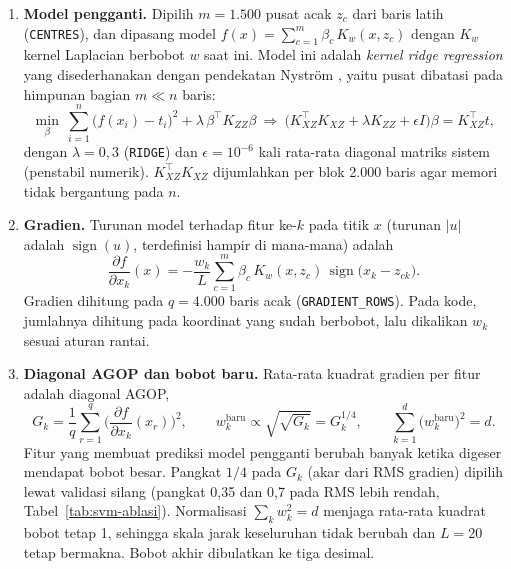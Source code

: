 \begin{enumerate}
	\item \textbf{Model pengganti.} Dipilih $m = 1.500$ pusat acak $z_c$ dari baris latih (\texttt{CENTRES}), dan dipasang model $f(x) = \sum_{c=1}^{m} \beta_c\,K_w(x, z_c)$ dengan $K_w$ kernel Laplacian berbobot $w$ saat ini. Model ini adalah \textit{kernel ridge regression} \cite{saunders1998ridge} yang disederhanakan dengan pendekatan Nystr\"om \cite{williams2001nystrom}, yaitu pusat dibatasi pada himpunan bagian $m \ll n$ baris:
	\begin{equation}
		\min_{\beta}\ \sum_{i=1}^{n}\big(f(x_i) - t_i\big)^2 + \lambda\,\beta^{\top}K_{ZZ}\beta
		\ \Longrightarrow\
		\big(K_{XZ}^{\top}K_{XZ} + \lambda K_{ZZ} + \epsilon I\big)\beta = K_{XZ}^{\top}t,
		\label{eq:svm-nystrom}
	\end{equation}
	dengan $\lambda = 0{,}3$ (\texttt{RIDGE}) dan $\epsilon = 10^{-6}$ kali rata-rata diagonal matriks sistem (penstabil numerik). $K_{XZ}^{\top}K_{XZ}$ dijumlahkan per blok 2.000 baris agar memori tidak bergantung pada $n$.
	\item \textbf{Gradien.} Turunan model terhadap fitur ke-$k$ pada titik $x$ (turunan $|u|$ adalah $\operatorname{sign}(u)$, terdefinisi hampir di mana-mana) adalah
	\begin{equation}
		\frac{\partial f}{\partial x_k}(x) = -\frac{w_k}{L}\sum_{c=1}^{m}\beta_c\,K_w(x, z_c)\,\operatorname{sign}\big(x_k - z_{ck}\big).
		\label{eq:svm-gradien}
	\end{equation}
	Gradien dihitung pada $q = 4.000$ baris acak (\texttt{GRADIENT\_ROWS}). Pada kode, jumlahnya dihitung pada koordinat yang sudah berbobot, lalu dikalikan $w_k$ sesuai aturan rantai.
	\item \textbf{Diagonal AGOP dan bobot baru.} Rata-rata kuadrat gradien per fitur adalah diagonal AGOP,
	\begin{equation}
		G_k = \frac{1}{q}\sum_{r=1}^{q}\Big(\frac{\partial f}{\partial x_k}(x_r)\Big)^{2}, \qquad
		w_k^{\text{baru}} \propto \sqrt{\sqrt{G_k}} = G_k^{1/4}, \qquad \sum_{k=1}^{d} \big(w_k^{\text{baru}}\big)^2 = d .
		\label{eq:svm-bobot}
	\end{equation}
	Fitur yang membuat prediksi model pengganti berubah banyak ketika digeser mendapat bobot besar. Pangkat $1/4$ pada $G_k$ (akar dari RMS gradien) dipilih lewat validasi silang (pangkat 0,35 dan 0,7 pada RMS lebih rendah, Tabel~\ref{tab:svm-ablasi}). Normalisasi $\sum_k w_k^2 = d$ menjaga rata-rata kuadrat bobot tetap 1, sehingga skala jarak keseluruhan tidak berubah dan $L = 20$ tetap bermakna. Bobot akhir dibulatkan ke tiga desimal.
\end{enumerate}

